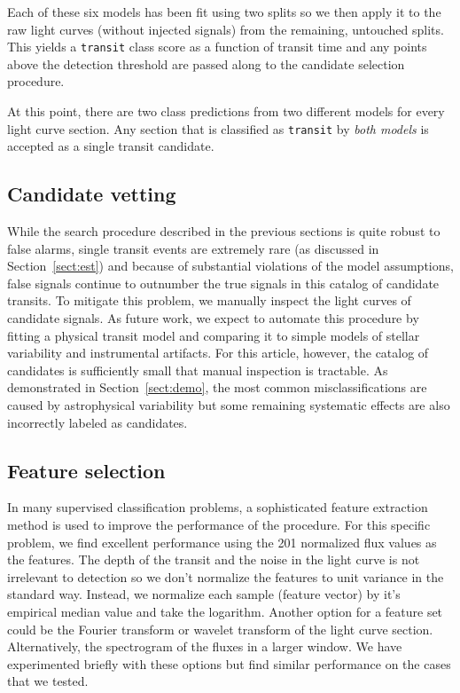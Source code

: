 \documentclass[12pt,preprint]{aastex}
\newcommand{\paper}{article}
\newcommand{\sectionname}{Section}
\newcommand{\sectref}[1]{\ref{sect:#1}}
\newcommand{\Sect}[1]{\sectionname~\sectref{#1}}
\newcommand{\sect}[1]{\Sect{#1}}
\newcommand{\sectlabel}[1]{\label{sect:#1}}
\newcommand{\todo}[3]{{\color{#2}\emph{#1}: #3}}
\newcommand{\dfmtodo}[1]{\todo{DFM}{red}{#1}}
\begin{document}
Each of these six models has been fit using two splits so we then apply it to
the raw light curves (without injected signals) from the remaining, untouched
splits.
This yields a \texttt{transit} class score as a function of transit time and
any points above the detection threshold are passed along to the candidate
selection procedure.

At this point, there are two class predictions from two different models for
every light curve section.
Any section that is classified as \texttt{transit} by \emph{both models} is
accepted as a single transit candidate.



\subsection{Candidate vetting}\sectlabel{vetting}

While the search procedure described in the previous sections is quite robust
to false alarms, single transit events are extremely rare (as discussed in
\sect{est}) and because of substantial violations of the model assumptions,
false signals continue to outnumber the true signals in this catalog of
candidate transits.
To mitigate this problem, we manually inspect the light curves of candidate
signals.
As future work, we expect to automate this procedure by fitting a physical
transit model and comparing it to simple models of stellar variability and
instrumental artifacts.
For this \paper, however, the catalog of candidates is sufficiently small that
manual inspection is tractable.
As demonstrated in \sect{demo}, the most common misclassifications are caused
by astrophysical variability but some remaining systematic effects are also
incorrectly labeled as candidates.


\subsection{Feature selection}\sectlabel{features}

In many supervised classification problems, a sophisticated feature
extraction method is used to improve the performance of the procedure.
For this specific problem, we find excellent performance using the 201
normalized flux values as the features.
The depth of the transit and the noise in the light curve is not irrelevant
to detection so we don't normalize the features to unit variance in the
standard way.
Instead, we normalize each sample (feature vector) by it's empirical median
value and take the logarithm.
Another option for a feature set could be the Fourier transform or wavelet
transform of the light curve section.
Alternatively, the spectrogram of the fluxes in a larger window.
We have experimented briefly with these options but find similar performance
on the cases that we tested.
\end{document}
